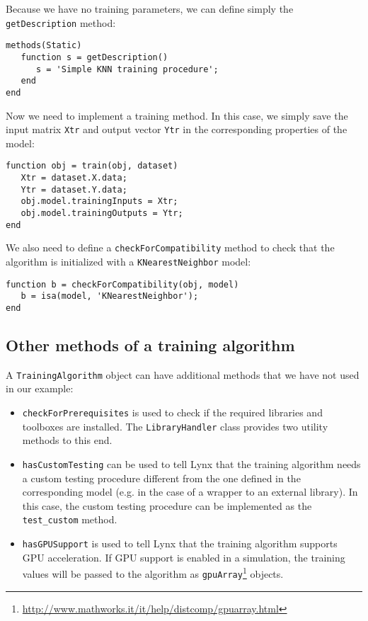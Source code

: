 \noindent Because we have no training parameters, we can define simply the \verb|getDescription| method:

\begin{lstlisting}
methods(Static)
   function s = getDescription()
      s = 'Simple KNN training procedure';
   end
end
\end{lstlisting}

\noindent Now we need to implement a training method. In this case, we simply save the input matrix \verb|Xtr| and output vector \verb|Ytr| in the corresponding properties of the model:

\begin{lstlisting}
function obj = train(obj, dataset)
   Xtr = dataset.X.data;
   Ytr = dataset.Y.data;
   obj.model.trainingInputs = Xtr;
   obj.model.trainingOutputs = Ytr;                    
end
\end{lstlisting}

\noindent We also need to define a \verb|checkForCompatibility| method to check that the algorithm is initialized with a \verb|KNearestNeighbor| model:

\begin{lstlisting}
function b = checkForCompatibility(obj, model)
   b = isa(model, 'KNearestNeighbor');
end
\end{lstlisting}

\subsection{Other methods of a training algorithm}

A \verb|TrainingAlgorithm| object can have additional methods that we have not used in our example:

\begin{itemize}
\item \verb|checkForPrerequisites| is used to check if the required libraries and toolboxes are installed. The \verb|LibraryHandler| class provides two utility methods to this end.
\item \verb|hasCustomTesting| can be used to tell Lynx that the training algorithm needs a custom testing procedure different from the one defined in the corresponding model (e.g. in the case of a wrapper to an external library). In this case, the custom testing procedure can be implemented as the \verb|test_custom| method.
\item \verb|hasGPUSupport| is used to tell Lynx that the training algorithm supports GPU acceleration. If GPU support is enabled in a simulation, the training values will be passed to the algorithm as \verb|gpuArray|\footnote{\url{http://www.mathworks.it/it/help/distcomp/gpuarray.html}} objects.
\end{itemize}

